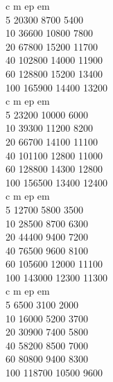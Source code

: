     c     m        ep      em     \\
    5     20300    8700    5400   \\
    10    36600    10800   7800   \\
    20    67800    15200   11700  \\
    40    102800   14000   11900  \\
    60    128800   15200   13400  \\
    100   165900   14400   13200  \\

    c     m        ep      em     \\
    5     23200    10000   6000   \\
    10    39300    11200   8200   \\
    20    66700    14100   11100  \\
    40    101100   12800   11000  \\
    60    128800   14300   12800  \\
    100   156500   13400   12400  \\

    c     m        ep      em     \\
    5     12700    5800    3500   \\
    10    28500    8700    6300   \\
    20    44400    9400    7200   \\
    40    76500    9600    8100   \\
    60    105600   12000   11100  \\
    100   143000   12300   11300  \\

    c     m        ep      em     \\
    5     6500     3100    2000   \\
    10    16000    5200    3700   \\
    20    30900    7400    5800   \\
    40    58200    8500    7000   \\
    60    80800    9400    8300   \\
    100   118700   10500   9600   \\
